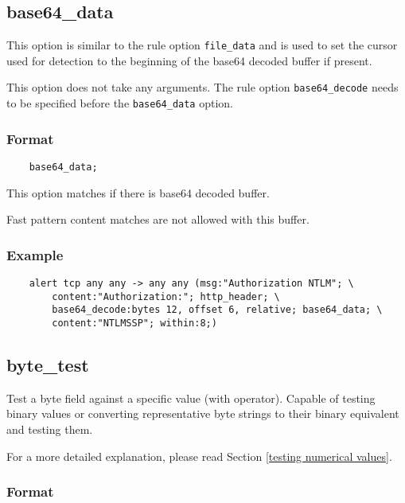 \documentclass[english]{report}
\newenvironment{note}{
\samepage
    \vspace{10pt}{\textsf{
        {\hspace{7pt}\Huge{$\triangle$\hspace{-12.5pt}{\Large{$^!$}}}}\hspace{5pt}
        {\Large{NOTE}}
    }
    }
   \begin{center}
    \par\vspace{-17pt}

    \begin{lrbox}{\savepar}
    \begin{minipage}[r]{6in}
}
{
    \end{minipage}
    \end{lrbox}
    \fbox{
        \usebox{
            \savepar
	}
    }
    \par\vskip10pt
    \end{center}
}
\newenvironment{note}{
        \begin{rawhtml}
        <p><table border="1"><tr><td><b>
        Note:&nbsp;&nbsp;</b>
        \end{rawhtml}
}{
        \begin{rawhtml}
        </b></td></tr></table></p>
        \end{rawhtml}
}
\begin{document}
\subsection{base64\_data}
\label{sub:base64_data}
This option is similar to the rule option \texttt{file\_data} and is used 
to set the cursor used for detection to the beginning of the base64 decoded 
buffer if present.

This option does not take any arguments. The rule option \texttt{base64\_decode}
needs to be specified before the \texttt{base64\_data} option. 

\subsubsection{Format}

\begin{verbatim}
	base64_data;
\end{verbatim}

This option matches if there is base64 decoded buffer.

\begin{note}

Fast pattern content matches are not allowed with this buffer.
\end{note}


\subsubsection{Example}

\begin{verbatim}
    alert tcp any any -> any any (msg:"Authorization NTLM"; \
        content:"Authorization:"; http_header; \
        base64_decode:bytes 12, offset 6, relative; base64_data; \
        content:"NTLMSSP"; within:8;)
\end{verbatim}


\subsection{byte\_test}
\label{sub:byte_test}

Test a byte field against a specific value (with operator).  Capable of testing
binary values or converting representative byte strings to their binary
equivalent and testing them.

For a more detailed explanation, please read Section \ref{testing numerical
values}.

\subsubsection{Format}
\end{document}

